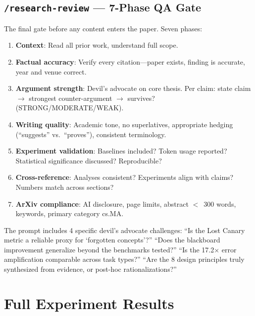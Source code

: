 \documentclass{article}
\begin{document}
\subsection{\texttt{/research-review} --- 7-Phase QA Gate}

The final gate before any content enters the paper. Seven phases:

\begin{enumerate}[nosep]
  \item \textbf{Context}: Read all prior work, understand full scope.
  \item \textbf{Factual accuracy}: Verify every citation---paper exists, finding is
    accurate, year and venue correct.
  \item \textbf{Argument strength}: Devil's advocate on core thesis. Per claim:
    state claim $\to$ strongest counter-argument $\to$ survives?
    (STRONG/MODERATE/WEAK).
  \item \textbf{Writing quality}: Academic tone, no superlatives, appropriate
    hedging (``suggests'' vs.\ ``proves''), consistent terminology.
  \item \textbf{Experiment validation}: Baselines included? Token usage reported?
    Statistical significance discussed? Reproducible?
  \item \textbf{Cross-reference}: Analyses consistent? Experiments align with
    claims? Numbers match across sections?
  \item \textbf{ArXiv compliance}: AI disclosure, page limits, abstract $<$~300
    words, keywords, primary category cs.MA.
\end{enumerate}

\noindent The prompt includes 4 specific devil's advocate challenges: ``Is the Lost
Canary metric a reliable proxy for `forgotten concepts'?'' ``Does the blackboard
improvement generalize beyond the benchmarks tested?'' ``Is the 17.2$\times$ error
amplification comparable across task types?'' ``Are the 8 design principles truly
synthesized from evidence, or post-hoc rationalizations?''

\section{Full Experiment Results}
\label{app:experiments}

%
%
\end{document}

